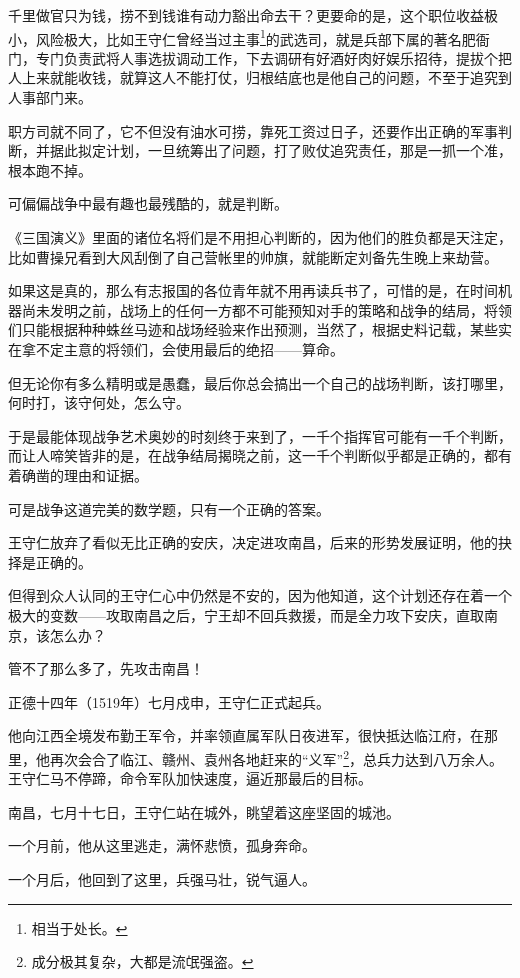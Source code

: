 \begin{multicols}{\theparacolNo}
		千里做官只为钱，捞不到钱谁有动力豁出命去干？更要命的是，这个职位收益极小，风险极大，比如王守仁曾经当过主事\footnote{相当于处长。}的武选司，就是兵部下属的著名肥衙门，专门负责武将人事选拔调动工作，下去调研有好酒好肉好娱乐招待，提拔个把人上来就能收钱，就算这人不能打仗，归根结底也是他自己的问题，不至于追究到人事部门来。

		职方司就不同了，它不但没有油水可捞，靠死工资过日子，还要作出正确的军事判断，并据此拟定计划，一旦统筹出了问题，打了败仗追究责任，那是一抓一个准，根本跑不掉。

		可偏偏战争中最有趣也最残酷的，就是判断。

		《三国演义》里面的诸位名将们是不用担心判断的，因为他们的胜负都是天注定，比如曹操兄看到大风刮倒了自己营帐里的帅旗，就能断定刘备先生晚上来劫营。

		如果这是真的，那么有志报国的各位青年就不用再读兵书了，可惜的是，在时间机器尚未发明之前，战场上的任何一方都不可能预知对手的策略和战争的结局，将领们只能根据种种蛛丝马迹和战场经验来作出预测，当然了，根据史料记载，某些实在拿不定主意的将领们，会使用最后的绝招——算命。

		但无论你有多么精明或是愚蠢，最后你总会搞出一个自己的战场判断，该打哪里，何时打，该守何处，怎么守。

		于是最能体现战争艺术奥妙的时刻终于来到了，一千个指挥官可能有一千个判断，而让人啼笑皆非的是，在战争结局揭晓之前，这一千个判断似乎都是正确的，都有着确凿的理由和证据。

		可是战争这道完美的数学题，只有一个正确的答案。

		王守仁放弃了看似无比正确的安庆，决定进攻南昌，后来的形势发展证明，他的抉择是正确的。

		但得到众人认同的王守仁心中仍然是不安的，因为他知道，这个计划还存在着一个极大的变数——攻取南昌之后，宁王却不回兵救援，而是全力攻下安庆，直取南京，该怎么办？

		管不了那么多了，先攻击南昌！

		正德十四年（1519年）七月戍申，王守仁正式起兵。

		他向江西全境发布勤王军令，并率领直属军队日夜进军，很快抵达临江府，在那里，他再次会合了临江、赣州、袁州各地赶来的“义军”\footnote{成分极其复杂，大都是流氓强盗。}，总兵力达到八万余人。王守仁马不停蹄，命令军队加快速度，逼近那最后的目标。

		南昌，七月十七日，王守仁站在城外，眺望着这座坚固的城池。

		一个月前，他从这里逃走，满怀悲愤，孤身奔命。

		一个月后，他回到了这里，兵强马壮，锐气逼人。


\end{multicols}
